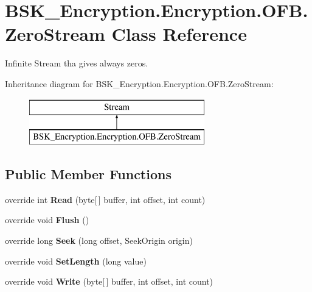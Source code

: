 \hypertarget{class_b_s_k___encryption_1_1_encryption_1_1_o_f_b_1_1_zero_stream}{}\section{B\+S\+K\+\_\+\+Encryption.\+Encryption.\+O\+F\+B.\+Zero\+Stream Class Reference}
\label{class_b_s_k___encryption_1_1_encryption_1_1_o_f_b_1_1_zero_stream}


Infinite Stream tha gives always zeros.  


Inheritance diagram for B\+S\+K\+\_\+\+Encryption.\+Encryption.\+O\+F\+B.\+Zero\+Stream\+:\begin{figure}[H]
\begin{center}
\leavevmode
\includegraphics[height=2.000000cm]{class_b_s_k___encryption_1_1_encryption_1_1_o_f_b_1_1_zero_stream}
\end{center}
\end{figure}
\subsection*{Public Member Functions}
\begin{DoxyCompactItemize}
\item 
\mbox{\label{class_b_s_k___encryption_1_1_encryption_1_1_o_f_b_1_1_zero_stream_a48a7f982b8a029dd87eba9bd79822d16}} 
override int {\bfseries Read} (byte\mbox{[}$\,$\mbox{]} buffer, int offset, int count)
\item 
\mbox{\label{class_b_s_k___encryption_1_1_encryption_1_1_o_f_b_1_1_zero_stream_a6c79205edc2aea33e6d6b314e6e002c8}} 
override void {\bfseries Flush} ()
\item 
\mbox{\label{class_b_s_k___encryption_1_1_encryption_1_1_o_f_b_1_1_zero_stream_a2523d01afb53df768fd3e09e3b565fec}} 
override long {\bfseries Seek} (long offset, Seek\+Origin origin)
\item 
\mbox{\label{class_b_s_k___encryption_1_1_encryption_1_1_o_f_b_1_1_zero_stream_aa98fad7a1c99b11dd7a12bf73ea51203}} 
override void {\bfseries Set\+Length} (long value)
\item 
\mbox{\label{class_b_s_k___encryption_1_1_encryption_1_1_o_f_b_1_1_zero_stream_a18edb32e349ca66981c9ab7cfc6c1c5d}} 
override void {\bfseries Write} (byte\mbox{[}$\,$\mbox{]} buffer, int offset, int count)
\end{DoxyCompactItemize}
